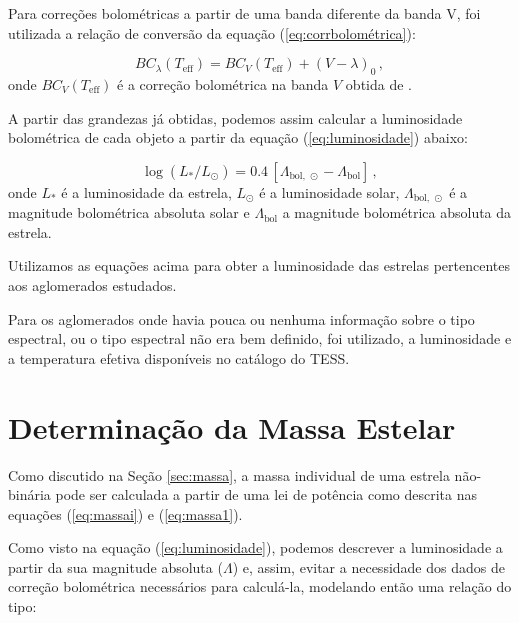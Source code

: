         Para correções bolométricas a partir de uma banda diferente da banda V, foi utilizada a relação de conversão da equação (\ref{eq:corrbolométrica}):
        
        \begin{equation}
            \label{eq:corrbolométrica}
            BC_{\lambda}(T_{\text{eff}}) = BC_V(T_{\text{eff}}) + (V - \lambda)_0 \, ,
        \end{equation}
        \noindent onde \(BC_V(T_{\text{eff}})\) é a correção bolométrica na banda \(V\) obtida de .
        
        A partir das grandezas já obtidas, podemos assim calcular a luminosidade bolométrica de cada objeto a partir da equação (\ref{eq:luminosidade}) abaixo:
        
        \begin{equation}
            \label{eq:luminosidade}
            \log\left({L_*}/{L_\odot}\right) = 0.4\,[\Lambda_{\text{bol},\,\odot} - \Lambda_{\text{bol}}] \, ,
        \end{equation}
		\noindent onde \(L_*\) é a luminosidade da estrela, \(L_\odot\) é a luminosidade solar, \(\Lambda_{\text{bol},\,\odot}\) é a magnitude bolométrica absoluta solar e \(\Lambda_{\text{bol}}\)
        a magnitude bolométrica absoluta da estrela.

        Utilizamos as equações acima para obter a luminosidade das estrelas pertencentes aos aglomerados estudados.

        Para os aglomerados onde havia pouca ou nenhuma informação sobre o tipo espectral, ou o tipo espectral não era bem definido, foi utilizado, a luminosidade e a temperatura efetiva disponíveis no catálogo do TESS.
        
    \section{Determinação da Massa Estelar}\label{sec:massa_estelar}
        Como discutido na Seção \ref{sec:massa}, a massa individual de uma estrela não-binária pode ser calculada a partir de uma lei de potência como descrita nas equações (\ref{eq:massai}) e (\ref{eq:massa1}).


        Como visto na equação (\ref{eq:luminosidade}), podemos descrever a luminosidade a partir da sua magnitude absoluta (\(\Lambda\)) e, assim, evitar a necessidade dos dados de correção bolométrica necessários para calculá-la, modelando então uma relação do tipo:

